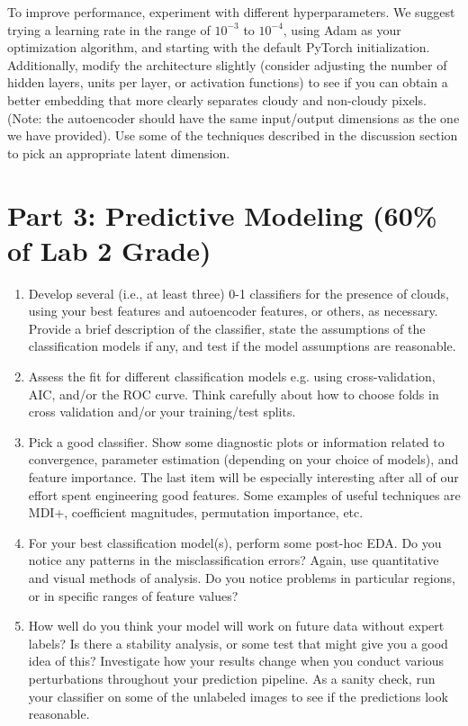 \documentclass[letterpaper,12pt]{article}
\begin{document}
To improve performance, experiment with different hyperparameters. We suggest trying a learning rate in the range of $10^{-3}$ to $10^{-4}$, using Adam as your optimization algorithm, and starting with the default PyTorch initialization.  
Additionally, modify the architecture slightly (consider adjusting the number of hidden layers, units per layer, or activation functions) to see if you can obtain a better embedding that more clearly separates cloudy and non-cloudy pixels. 
(Note: the autoencoder should have the same input/output dimensions as the one we have provided). 
Use some of the techniques described in the discussion section to pick an appropriate latent dimension.

\section*{Part 3: Predictive Modeling (60\% of Lab 2 Grade)}
\begin{enumerate}
    \item Develop several (i.e., at least three) 0-1 classifiers for the presence of clouds, using your best features and autoencoder features, or others, as necessary. Provide a brief description of the classifier, state the assumptions of the classification models if any, and test if the model assumptions are reasonable.
    
    \item Assess the fit for different classification models e.g. using cross-validation, AIC, and/or the ROC curve. Think carefully about how to choose folds in cross validation and/or your training/test splits.
    
    \item Pick a good classifier. Show some diagnostic plots or information related to convergence, parameter estimation (depending on your choice of models), and feature importance. The last item will be especially interesting after all of our effort spent engineering good features. Some examples of useful techniques are MDI+, coefficient magnitudes, permutation importance, etc.
    
    \item For your best classification model(s), perform some post-hoc EDA. Do you notice any patterns in the misclassification errors? Again, use quantitative and visual methods of analysis. Do you notice problems in particular regions, or in specific ranges of feature values?
    
    \item How well do you think your model will work on future data without expert labels? Is there a stability analysis, or some test that might give you a good idea of this? Investigate how your results change when you conduct various perturbations throughout your prediction pipeline. As a sanity check, run your classifier on some of the unlabeled images to see if the predictions look reasonable.
\end{enumerate}
\end{document}
